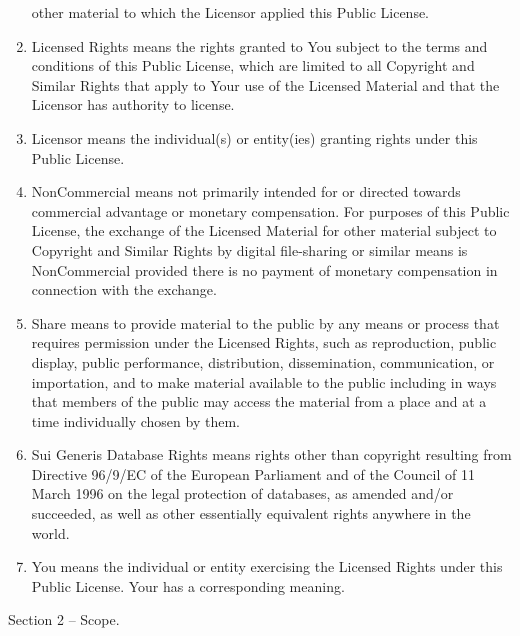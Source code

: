 \documentclass[
]{scrbook}
\begin{document}
\begin{enumerate}
  other material to which the Licensor applied this Public License.
\item
  Licensed Rights means the rights granted to You subject to the terms
  and conditions of this Public License, which are limited to all
  Copyright and Similar Rights that apply to Your use of the Licensed
  Material and that the Licensor has authority to license.
\item
  Licensor means the individual(s) or entity(ies) granting rights under
  this Public License.
\item
  NonCommercial means not primarily intended for or directed towards
  commercial advantage or monetary compensation. For purposes of this
  Public License, the exchange of the Licensed Material for other
  material subject to Copyright and Similar Rights by digital
  file-sharing or similar means is NonCommercial provided there is no
  payment of monetary compensation in connection with the exchange.
\item
  Share means to provide material to the public by any means or process
  that requires permission under the Licensed Rights, such as
  reproduction, public display, public performance, distribution,
  dissemination, communication, or importation, and to make material
  available to the public including in ways that members of the public
  may access the material from a place and at a time individually chosen
  by them.
\item
  Sui Generis Database Rights means rights other than copyright
  resulting from Directive 96/9/EC of the European Parliament and of the
  Council of 11 March 1996 on the legal protection of databases, as
  amended and/or succeeded, as well as other essentially equivalent
  rights anywhere in the world.
\item
  You means the individual or entity exercising the Licensed Rights
  under this Public License. Your has a corresponding meaning.
\end{enumerate}

Section 2 -- Scope.
\end{document}
